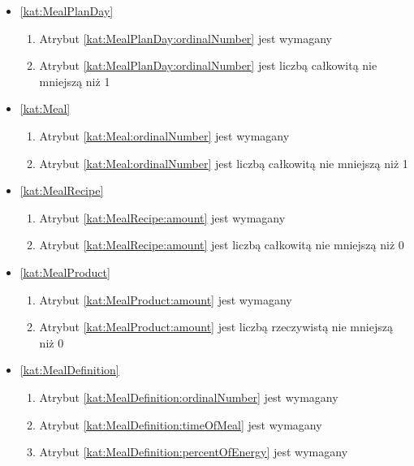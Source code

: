 \begin{itemize}[label={\textbf{Ograniczenia dla}}, wide, labelwidth=!, labelindent=0pt]
    \item\ref{kat:MealPlanDay}\mynobreakpar
    \begin{enumerate}[label={\textbf{OGR/4/\protect\twodigits{\arabic{enumi}}}}, wide, labelwidth=!, align=left, leftmargin=3cm, resume]
        \item Atrybut \ref{kat:MealPlanDay:ordinalNumber} jest wymagany

        \item Atrybut \ref{kat:MealPlanDay:ordinalNumber} jest liczbą całkowitą nie mniejszą niż 1
    \end{enumerate}

    \item\ref{kat:Meal}\mynobreakpar
    \begin{enumerate}[label={\textbf{OGR/4/\protect\twodigits{\arabic{enumi}}}}, wide, labelwidth=!, align=left, leftmargin=3cm, resume]
        \item Atrybut \ref{kat:Meal:ordinalNumber} jest wymagany

        \item Atrybut \ref{kat:Meal:ordinalNumber} jest liczbą całkowitą nie mniejszą niż 1
    \end{enumerate}

    \item\ref{kat:MealRecipe}\mynobreakpar
    \begin{enumerate}[label={\textbf{OGR/4/\protect\twodigits{\arabic{enumi}}}}, wide, labelwidth=!, align=left, leftmargin=3cm, resume]
        \item Atrybut \ref{kat:MealRecipe:amount} jest wymagany

        \item Atrybut \ref{kat:MealRecipe:amount} jest liczbą całkowitą nie mniejszą niż 0
    \end{enumerate}

    \item\ref{kat:MealProduct}\mynobreakpar
    \begin{enumerate}[label={\textbf{OGR/4/\protect\twodigits{\arabic{enumi}}}}, wide, labelwidth=!, align=left, leftmargin=3cm, resume]
        \item Atrybut \ref{kat:MealProduct:amount} jest wymagany

        \item Atrybut \ref{kat:MealProduct:amount} jest liczbą rzeczywistą nie mniejszą niż 0
    \end{enumerate}

    \item\ref{kat:MealDefinition}\mynobreakpar
    \begin{enumerate}[label={\textbf{OGR/4/\protect\twodigits{\arabic{enumi}}}}, wide, labelwidth=!, align=left, leftmargin=3cm, resume]
        \item Atrybut \ref{kat:MealDefinition:ordinalNumber} jest wymagany
        \item Atrybut \ref{kat:MealDefinition:timeOfMeal} jest wymagany
        \item Atrybut \ref{kat:MealDefinition:percentOfEnergy} jest wymagany


\end{enumerate}
\end{itemize}
